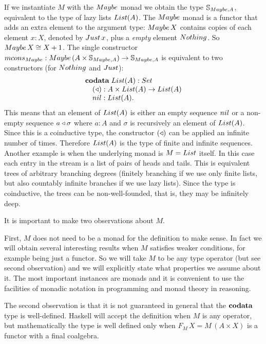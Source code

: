 If we instantiate $M$ with the $\maybe$ monad we obtain the type $\stream{\maybe,A}$, equivalent to the type of lazy lists $\lst{A}$.
The $\maybe$ monad is a functor that adds an extra element to the argument type:
$\maybe\,X$ contains copies of each element $x:X$, denoted by $\just\,x$, plus a {\em empty} element $\nothing$.
So $\maybe\,X \cong X+1$.
The single constructor $\mcons_\maybe: \maybe\,(A\times \stream{\maybe,A})\rightarrow\stream{\maybe,A}$ is equivalent to two constructors (for $\nothing$ and $\just$):
$$
\begin{array}[t]{l}
\codata\;
\lst{A}:\set\\
\quad (\scons): A\times \lst{A}\rightarrow\lst{A}\\
\quad \nil: \lst{A}.
\end{array}
$$
This means that an element of $\lst{A}$ is either an empty sequence $\nil$ or a non-empty sequence $a\triangleleft \sigma$ where $a:A$ and $\sigma$ is recursively an element of $\lst{A}$.
Since this is a coinductive type, the constructor $(\triangleleft)$ can be applied an infinite number of times.
Therefore $\lst{A}$ is the type of finite and infinite sequences. \\

Another example is when the underlying monad is $M = \lstsym $ itself.
In this case each entry in the stream is a list of pairs of heads and tails.
This is equivalent trees of arbitrary branching degrees (finitely branching if we use only finite lists, but also countably infinite branches if we use lazy lists).
Since the type is coinductive, the trees can be non-well-founded, that is, they may be infinitely deep.


It is important to make two observations about $M$.

First, $M$ does not need to be a monad for the definition to make sense. 
In fact we will obtain several interesting results when $M$ satisfies weaker conditions, for example being just a functor.
So we will take $M$ to be any type operator (but see second observation) and we will explicitly state what properties we assume about it.
The most important instances are monads and it is convenient to use the facilities of monadic notation in programming and monad theory in reasoning.

The second observation is that it is not guaranteed in general that the $\mathbf{codata}$ type is well-defined.
Haskell will accept the definition when $M$ is any operator, but mathematically the type is well defined only when $F_M\,X = M\,(A\times X)$ is a functor with a final coalgebra.


